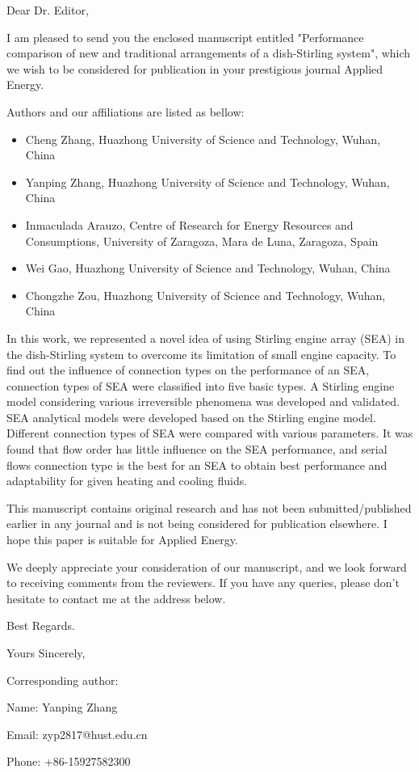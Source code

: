 \documentclass[12pt]{letter}
\begin{document}
Dear Dr. Editor,

I am pleased to send you the enclosed manuscript entitled "Performance comparison of new and traditional arrangements of a dish-Stirling system", which we wish to be considered for publication in your prestigious journal Applied Energy.

Authors and our affiliations are listed as bellow:

\begin{itemize}
  \item Cheng Zhang, Huazhong University of Science and Technology, Wuhan, China

  \item Yanping Zhang, Huazhong University of Science and Technology, Wuhan, China
  
  \item Inmaculada Arauzo, Centre of Research for Energy Resources and Consumptions, University of Zaragoza, Mara de Luna, Zaragoza, Spain
  
  \item Wei Gao, Huazhong University of Science and Technology, Wuhan, China
  
  \item Chongzhe Zou, Huazhong University of Science and Technology, Wuhan, China

\end{itemize}

In this work, we represented a novel idea of using Stirling engine array (SEA) in the dish-Stirling system to overcome its limitation of small engine capacity. To find out the influence of connection types on the performance of an SEA, connection types of SEA were classified into five basic types. A Stirling engine model considering various irreversible phenomena was developed and validated. SEA analytical models were developed based on the Stirling engine model. Different connection types of SEA were compared with various parameters. It was found that flow order has little influence on the SEA performance, and serial flows connection type is the best for an SEA to obtain best performance and adaptability for given heating and cooling fluids.

This manuscript contains original research and has not been submitted/published earlier in any journal and is not being considered for publication elsewhere. I hope this paper is suitable for Applied Energy.

We deeply appreciate your consideration of our manuscript, and we look forward to receiving comments from the reviewers. If you have any queries, please don't hesitate to contact me at the address below.

Best Regards.

Yours Sincerely,

Corresponding author:

Name: Yanping Zhang

Email: zyp2817@hust.edu.cn

Phone: +86-15927582300
\end{document}
